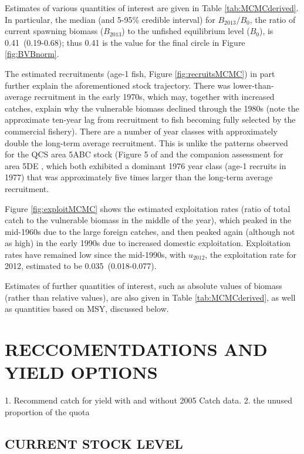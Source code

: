 Estimates of various quantities of interest are given in Table \ref{tab:MCMCderived}. In particular, the median (and 5-95\% credible interval) for $B_{2013}/B_0$, the ratio of current spawning biomass ($B_{2013}$) to the unfished equilibrium level ($B_0$), is 0.41~(0.19-0.68); thus 0.41 is the value for the final circle in Figure \ref{fig:BVBnorm}.

The estimated recruitments (age-1 fish, Figure \ref{fig:recruitsMCMC}) in part further explain the aforementioned stock trajectory. There was lower-than-average recruitment in the early 1970s, which may, together with increased catches, explain why the vulnerable biomass declined through the 1980s (note the approximate ten-year lag from recruitment to fish becoming fully selected by the commercial fishery). There are a number of year classes with approximately double the long-term average recruitment. This is unlike the patterns observed for the QCS area 5ABC stock (Figure 5 of  and the companion assessment for area 5DE , which both exhibited a dominant 1976 year class (age-1 recruits in 1977) that was approximately five times larger than the long-term average recruitment.    

Figure \ref{fig:exploitMCMC} shows the estimated exploitation rates (ratio of total catch to the vulnerable biomass in the middle of the year), which peaked in the mid-1960s due to the large foreign catches, and then peaked again (although not as high) in the early 1990s due to increased domestic exploitation. Exploitation rates have remained low since the mid-1990s, with $u_{2012}$, the exploitation rate for 2012, estimated to be 0.035~(0.018-0.077).

Estimates of further quantities of interest, such as absolute values of biomass (rather than relative values), are also given in Table \ref{tab:MCMCderived}, as well as quantities based on MSY, discussed below. 

\section{RECCOMENTDATIONS AND YIELD OPTIONS}
1. Recommend catch for yield with and without 2005 Catch data.
2. the unused proportion of the quota

\subsection{CURRENT STOCK LEVEL}

